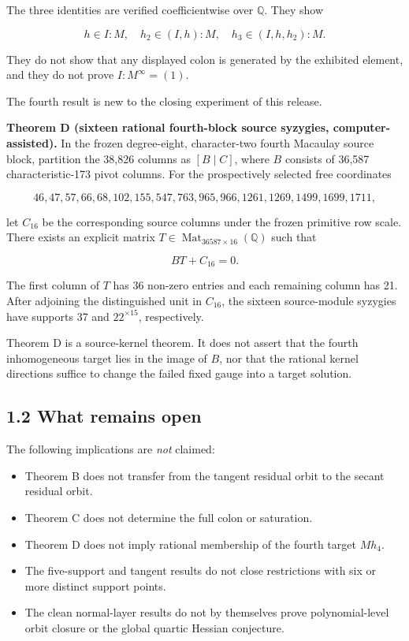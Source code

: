 \documentclass[
  11pt,
]{article}
\providecommand{\tightlist}{%
  \setlength{\itemsep}{0pt}\setlength{\parskip}{0pt}}
\begin{document}
The three identities are verified coefficientwise over \(\mathbb Q\).
They show

\[
h\in I:M,\quad h_2\in(I,h):M,\quad h_3\in(I,h,h_2):M.
\]

They do not show that any displayed colon is generated by the exhibited
element, and they do not prove \(I:M^\infty=(1)\).

The fourth result is new to the closing experiment of this release.

\textbf{Theorem D (sixteen rational fourth-block source syzygies,
computer-assisted).} In the frozen degree-eight, character-two fourth
Macaulay source block, partition the 38,826 columns as \([B\mid C]\),
where \(B\) consists of 36,587 characteristic-173 pivot columns. For the
prospectively selected free coordinates

\[
46,47,57,66,68,102,155,547,763,965,966,1261,1269,1499,1699,1711,
\tag{1.4}
\]

let \(C_{16}\) be the corresponding source columns under the frozen
primitive row scale. There exists an explicit matrix
\(T\in\operatorname{Mat}_{36587\times16}(\mathbb Q)\) such that

\[
BT+C_{16}=0.
\tag{1.5}
\]

The first column of \(T\) has 36 non-zero entries and each remaining
column has 21. After adjoining the distinguished unit in \(C_{16}\), the
sixteen source-module syzygies have supports 37 and \(22^{\times15}\),
respectively.

Theorem D is a source-kernel theorem. It does not assert that the fourth
inhomogeneous target lies in the image of \(B\), nor that the rational
kernel directions suffice to change the failed fixed gauge into a target
solution.

\subsection{1.2 What remains open}\label{what-remains-open}

The following implications are \emph{not} claimed:

\begin{itemize}
\tightlist
\item
  Theorem B does not transfer from the tangent residual orbit to the
  secant residual orbit.
\item
  Theorem C does not determine the full colon or saturation.
\item
  Theorem D does not imply rational membership of the fourth target
  \(Mh_4\).
\item
  The five-support and tangent results do not close restrictions with
  six or more distinct support points.
\item
  The clean normal-layer results do not by themselves prove
  polynomial-level orbit closure or the global quartic Hessian
  conjecture.
\end{itemize}
\end{document}
